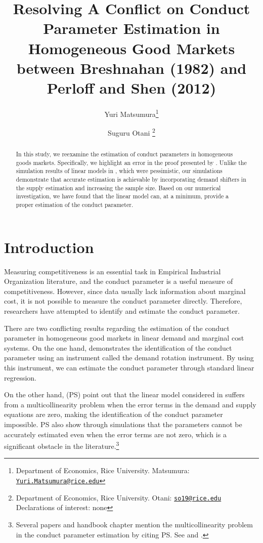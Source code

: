 \documentclass[11pt, a4paper]{article}
\title{Resolving A Conflict on Conduct Parameter Estimation in Homogeneous Good Markets between Breshnahan (1982) and Perloff and Shen (2012)}
\author{Yuri Matsumura\footnote{Department of Economics, Rice University. Matsumura: \texttt{\href{mailto:Yuri.Matsumura@rice.edu}{Yuri.Matsumura@rice.edu}}} \and Suguru Otani \footnote{Department of Economics, Rice University. Otani: \texttt{\href{mailto:so19@rice.edu}{so19@rice.edu}}\\
Declarations of interest: none}}
\begin{document}
\maketitle

\begin{abstract}
    In this study, we reexamine the estimation of conduct parameters in homogeneous goods markets. Specifically, we highlight an error in the proof presented by \cite{perloff2012collinearity}. Unlike the simulation results of linear models in \cite{perloff2012collinearity}, which were pessimistic, our simulations demonstrate that accurate estimation is achievable by incorporating demand shifters in the supply estimation and increasing the sample size. Based on our numerical investigation, we have found that the linear model can, at a minimum, provide a proper estimation of the conduct parameter.
\end{abstract}


\section{Introduction}
Measuring competitiveness is an essential task in Empirical Industrial Organization literature, and the conduct parameter is a useful measure of competitiveness. 
However, since data usually lack information about marginal cost, it is not possible to measure the conduct parameter directly. 
Therefore, researchers have attempted to identify and estimate the conduct parameter.

There are two conflicting results regarding the estimation of the conduct parameter in homogeneous good markets in linear demand and marginal cost systems. 
On the one hand, \cite{bresnahan1982oligopoly} demonstrates the identification of the conduct parameter using an instrument called the demand rotation instrument.
By using this instrument, we can estimate the conduct parameter through standard linear regression.

On the other hand, \cite{perloff2012collinearity} (PS) point out that the linear model considered in  \cite{bresnahan1982oligopoly} suffers from a multicollinearity problem when the error terms in the demand and supply equations are zero, making the identification of the conduct parameter impossible. 
PS also show through simulations that the parameters cannot be accurately estimated even when the error terms are not zero, which is a significant obstacle in the literature.\footnote{Several papers and handbook chapter mention the multicollinearity problem in the conduct parameter estimation by citing PS. See \citet{claessensWhatDrivesBank2004, coccoreseMultimarketContactCompetition2013, coccoreseWhatAffectsBank2021, garciaMarketStructuresProduction2020, kumbhakarNewMethodEstimating2012, perekhozhukRegionalLevelAnalysisOligopsony2015} and \citet{shafferMarketPowerCompetition2017}.}
\end{document}
